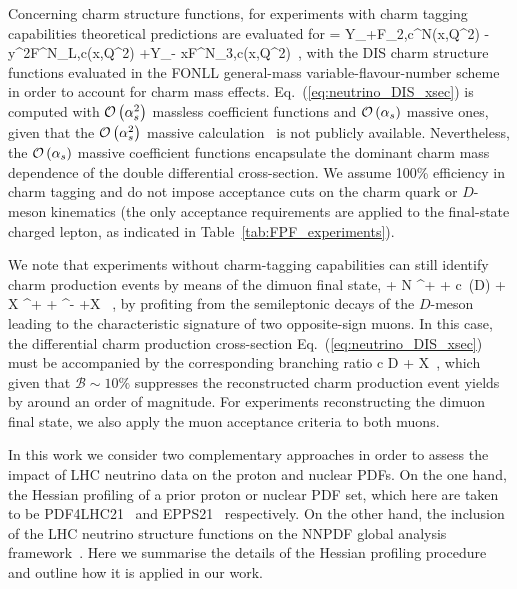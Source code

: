 Concerning charm structure functions, for experiments with charm tagging
capabilities theoretical predictions are evaluated for
\be
\label{eq:neutrino_DIS_xsec}
 =  \lc Y_+F_{2,c}^{\nu N}(x,Q^2) - y^2F^{\nu N}_{L,c}(x,Q^2) +Y_- xF^{\nu N}_{3,c}(x,Q^2)\rc  \, ,
\ee
with the DIS charm structure functions evaluated in the FONLL general-mass variable-flavour-number
scheme~\cite{Forte:2010ta,Ball:2011mu,Faura:2020oom} in order to account for charm mass effects.
%
Eq.~(\ref{eq:neutrino_DIS_xsec}) is computed with $\mathcal{O}\left( \alpha_s^2\right)$ massless
coefficient functions and $\mathcal{O}\left( \alpha_s\right)$ massive ones, given
that the $\mathcal{O}\left( \alpha_s^2\right)$ massive calculation~\cite{Gao:2017kkx} is not publicly available.
%
Nevertheless, the $\mathcal{O}\left( \alpha_s\right)$ massive coefficient functions
encapsulate the dominant charm mass dependence of the double differential
cross-section.
%
We assume 100\% efficiency in charm tagging and do not impose acceptance cuts on the charm
quark or $D$-meson kinematics (the only acceptance requirements are applied to the final-state
charged lepton, as indicated in  Table~\ref{tab:FPF_experiments}).

We note that experiments without charm-tagging capabilities can still identify charm production
events by means of the dimuon final state,
\be
\nu + N \to \mu^+ + c~(\to D) + X \to \mu^+ + \mu^- +X \, ,
\ee
by profiting from the semileptonic decays of the $D$-meson leading
to the characteristic signature of two opposite-sign muons.
%
In this case, the  differential charm production cross-section Eq.~(\ref{eq:neutrino_DIS_xsec})
must be accompanied by the corresponding branching ratio
\be
{}\lp c \to D \to \mu + X\rp \, ,
\ee
which given that $\mathcal{B}\sim 10\%$ suppresses the reconstructed charm
production event yields by around an order of magnitude.
%
For experiments reconstructing the dimuon final state,
we also apply the muon acceptance criteria to both muons.


In this work we consider two complementary approaches in order to assess the
impact of LHC neutrino data on the proton and nuclear PDFs.
%
On the one hand, the Hessian profiling of a prior proton or
nuclear PDF set, which here are taken to be PDF4LHC21~\cite{PDF4LHCWorkingGroup:2022cjn} and
EPPS21~\cite{Eskola:2021nhw} respectively.
%
On the other hand, the inclusion of the LHC neutrino structure functions
on the NNPDF global analysis framework~\cite{NNPDF:2021uiq,NNPDF:2021njg}.
%
Here we summarise the details of the Hessian profiling procedure and
outline how it is applied in our work.


